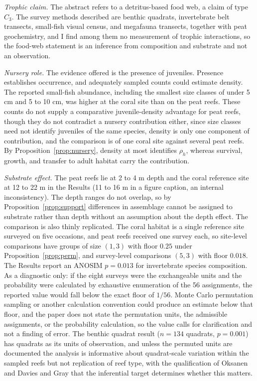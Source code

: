 \documentclass[11pt]{article}
\theoremstyle{definition}
\theoremstyle{remark}
\begin{document}
\emph{Trophic claim.} The abstract refers to a detritus-based food web, a claim of type $C_3$. The survey methods described are benthic quadrats, invertebrate belt transects, small-fish visual census, and megafauna transects, together with peat geochemistry, and I find among them no measurement of trophic interactions, so the food-web statement is an inference from composition and substrate and not an observation.

\emph{Nursery role.} The evidence offered is the presence of juveniles. Presence establishes occurrence, and adequately sampled counts could estimate density. The reported small-fish abundance, including the smallest size classes of under 5 cm and 5 to 10 cm, was higher at the coral site than on the peat reefs. These counts do not supply a comparative juvenile-density advantage for peat reefs, though they do not contradict a nursery contribution either, since size classes need not identify juveniles of the same species, density is only one component of contribution, and the comparison is of one coral site against several peat reefs. By Proposition~\ref{prop:nursery}, density at most identifies $\rho_h$, whereas survival, growth, and transfer to adult habitat carry the contribution.

\emph{Substrate effect.} The peat reefs lie at 2 to 4 m depth and the coral reference site at 12 to 22 m in the Results (11 to 16 m in a figure caption, an internal inconsistency). The depth ranges do not overlap, so by Proposition~\ref{prop:support} differences in assemblage cannot be assigned to substrate rather than depth without an assumption about the depth effect. The comparison is also thinly replicated. The coral habitat is a single reference site surveyed on five occasions, and peat reefs received one survey each, so site-level comparisons have groups of size $(1,3)$ with floor $0.25$ under Proposition~\ref{prop:perm}, and survey-level comparisons $(5,3)$ with floor $0.018$. The Results report an ANOSIM $p=0.013$ for invertebrate species composition. As a diagnostic only: if the eight surveys were the exchangeable units and the probability were calculated by exhaustive enumeration of the 56 assignments, the reported value would fall below the exact floor of $1/56$. Monte Carlo permutation sampling or another calculation convention could produce an estimate below that floor, and the paper does not state the permutation units, the admissible assignments, or the probability calculation, so the value calls for clarification and not a finding of error. The benthic quadrat result ($n=134$ quadrats, $p=0.001$) has quadrats as its units of observation, and unless the permuted units are documented the analysis is informative about quadrat-scale variation within the sampled reefs but not replication of reef type, with the qualification of Oksanen \cite{oksanen2001} and Davies and Gray \cite{davies2015} that the inferential target determines whether this matters.
\end{document}
